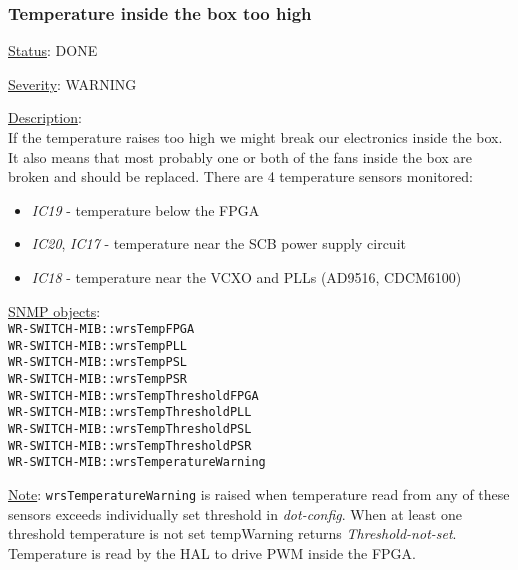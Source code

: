 \subsubsection{\bf Temperature inside the box too high}
		\label{fail:other:temp}
		\begin{packed_enum}
			\item [] \underline{Status}: DONE
			\item [] \underline{Severity}: WARNING
			\item [] \underline{Description}:\\
				If the temperature raises too high we might break our electronics inside
				the box. It also means that most probably one or both of the fans inside
				the box are broken and should be replaced. There are 4 temperature
				sensors monitored:
				\begin{itemize}
					\item \emph{IC19} - temperature below the FPGA
					\item \emph{IC20}, \emph{IC17} - temperature near the SCB power supply
						circuit
					\item \emph{IC18} - temperature near the VCXO and PLLs (AD9516,
						CDCM6100)
				\end{itemize}
			\item [] \underline{SNMP objects}:\\
				\texttt{WR-SWITCH-MIB::wrsTempFPGA}\\
				\texttt{WR-SWITCH-MIB::wrsTempPLL}\\
				\texttt{WR-SWITCH-MIB::wrsTempPSL}\\
				\texttt{WR-SWITCH-MIB::wrsTempPSR}\\
				\texttt{WR-SWITCH-MIB::wrsTempThresholdFPGA}\\
				\texttt{WR-SWITCH-MIB::wrsTempThresholdPLL}\\
				\texttt{WR-SWITCH-MIB::wrsTempThresholdPSL}\\
				\texttt{WR-SWITCH-MIB::wrsTempThresholdPSR}\\
				\texttt{WR-SWITCH-MIB::wrsTemperatureWarning}
			\item [] \underline{Note}:
			\texttt{wrsTemperatureWarning} is raised when temperature read from any of these sensors
			exceeds individually set threshold in \emph{dot-config}. When at least one threshold
			temperature is not set tempWarning returns \emph{Threshold-not-set}.
			Temperature is read by the HAL to drive PWM inside the FPGA.
		\end{packed_enum}

